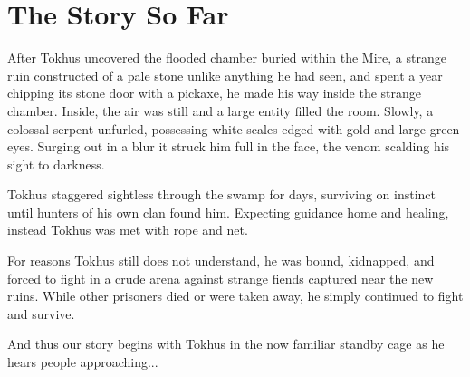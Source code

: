 \documentclass[letterpaper,twocolumn,openany,nodeprecatedcode,bg=full]{dndbook}
\begin{document}
\section{The Story So Far}
After Tokhus uncovered the flooded chamber buried within the Mire, a strange ruin constructed of a pale stone unlike anything he had seen, and spent a year chipping its stone door with a pickaxe, he made his way inside the strange chamber. Inside, the air was still and a large entity filled the room. Slowly, a colossal serpent unfurled, possessing white scales edged with gold and large green eyes. Surging out in a blur it struck him full in the face, the venom scalding his sight to darkness.

Tokhus staggered sightless through the swamp for days, surviving on instinct until hunters of his own clan found him. Expecting guidance home and healing, instead Tokhus was met with rope and net.

For reasons Tokhus still does not understand, he was bound, kidnapped, and forced to fight in a crude arena against strange fiends captured near the new ruins. While other prisoners died or were taken away, he simply continued to fight and survive.

And thus our story begins with Tokhus in the now familiar standby cage as he hears people approaching...
\end{document}
